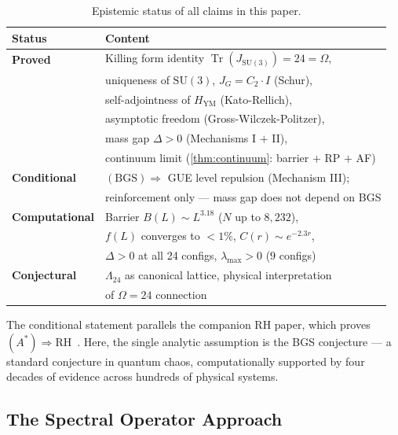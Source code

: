 \documentclass[11pt,a4paper]{article}
\theoremstyle{plain}
\theoremstyle{remark}
\renewcommand{\Omega}{\varOmega}
\newcommand{\Tr}{\operatorname{Tr}}
\newcommand{\SU}{\mathrm{SU}}
\begin{document}
\begin{table}[H]
\centering
\caption{Epistemic status of all claims in this paper.}
\label{tab:epistemic}
\smallskip
\begin{tabular}{ll}
\toprule
\textbf{Status} & \textbf{Content} \\
\midrule
\textbf{Proved} & Killing form identity $\Tr(J_{\SU(3)}) = 24 = \Omega$, \\
  & uniqueness of $\SU(3)$, $J_G = C_2 \cdot I$ (Schur), \\
  & self-adjointness of $H_{\mathrm{YM}}$ (Kato-Rellich), \\
  & asymptotic freedom (Gross-Wilczek-Politzer), \\
  & mass gap $\Delta > 0$ (Mechanisms I $+$ II), \\
  & continuum limit (\cref{thm:continuum}: barrier $+$ RP $+$ AF) \\
\textbf{Conditional} & $(\mathrm{BGS}) \Rightarrow$ GUE level repulsion (Mechanism III); \\
  & reinforcement only --- mass gap does not depend on BGS \\
\textbf{Computational} & Barrier $B(L) \sim L^{3.18}$ ($N$ up to $8{,}232$), \\
  & $f(L)$ converges to $< 1\%$, $C(r) \sim e^{-2.3r}$, \\
  & $\Delta > 0$ at all 24 configs, $\lambda_{\max} > 0$ (9 configs) \\
\textbf{Conjectural} & $\Lambda_{24}$ as canonical lattice, physical interpretation \\
  & of $\Omega = 24$ connection \\
\bottomrule
\end{tabular}
\end{table}

The conditional statement parallels the companion RH paper, which proves
$(A^*) \Rightarrow \mathrm{RH}$~\cite{DHR2026d}. Here, the single analytic
assumption is the BGS conjecture --- a standard conjecture in quantum chaos,
computationally supported by four decades of evidence across hundreds of
physical systems.

\subsection{The Spectral Operator Approach}
\end{document}
